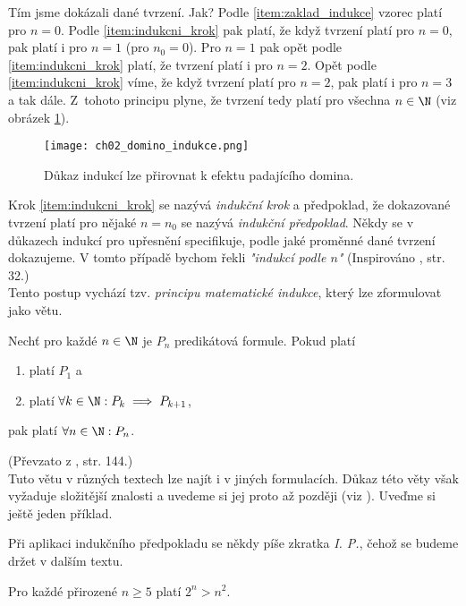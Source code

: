 Tím jsme dokázali dané tvrzení. Jak? Podle \ref{item:zaklad_indukce} vzorec platí pro $n=0$. Podle \ref{item:indukcni_krok} pak platí, že když tvrzení platí pro $n=0$, pak platí i pro $n=1$ (pro $n_0=0$). Pro $n=1$ pak opět podle \ref{item:indukcni_krok} platí, že tvrzení platí i pro $n=2$. Opět podle \ref{item:indukcni_krok} víme, že když tvrzení platí pro $n=2$, pak platí i pro $n=3$ a tak dále. Z~tohoto principu plyne, že tvrzení tedy platí pro všechna $n\in\N$ (viz obrázek \ref{fig:domino}).
\begin{figure}[h]
    \centering
    \texttt{[image: ch02\_domino\_indukce.png]}
    \caption{Důkaz indukcí lze přirovnat k efektu padajícího domina.}
    \label{fig:domino}
\end{figure}
Krok \ref{item:indukcni_krok} se nazývá \emph{indukční krok} a předpoklad, že dokazované tvrzení platí pro nějaké $n=n_0$ se nazývá \emph{indukční předpoklad}. Někdy se v důkazech indukcí pro upřesnění specifikuje, podle jaké proměnné dané tvrzení dokazujeme. V tomto případě bychom řekli \emph{"indukcí podle $n$"} (Inspirováno \cite{MatousekNesetril2009}, str. 32.)\\
Tento postup vychází tzv. \emph{principu matematické indukce}, který lze zformulovat jako větu.
\begin{theorem}
    Nechť pro každé $n\in\N$ je $P_n$ predikátová formule. Pokud platí
    \begin{enumerate}[label=(\roman*)]
        \item platí $P_1$ a
        \item platí $\forall k\in\N: P_k \implies P_{k+1}$,
    \end{enumerate}
    pak platí $\forall n\in\N: P_n$.
\end{theorem}
\noindent (Převzato z \cite{ChartrandPolimeniZhang2014}, str. 144.)\\
Tuto větu v různých textech lze najít i v jiných formulacích. Důkaz této věty však vyžaduje složitější znalosti a uvedeme si jej proto až později (viz ). Uveďme si ještě jeden příklad.
\begin{convention}
    Při aplikaci indukčního předpokladu se někdy píše zkratka \emph{I. P.}, čehož se budeme držet v dalším textu.
\end{convention}
\begin{assertion}
    Pro každé přirozené $n\geq 5$ platí $2^n>n^2$.
\end{assertion}
